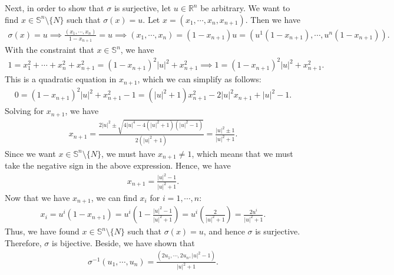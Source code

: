 Next, in order to show that $\sigma$ is surjective, let $u\in \mathbb{R}^n$ be arbitrary. We want to find $x\in \mathbb{S}^n\setminus \{N\}$ such that $\sigma(x)=u$. Let $x=(x_1,\cdots,x_n,x_{n+1})$. Then we have
\begin{align}
    \sigma(x)=u\implies \frac{(x_1,\cdots,x_n)}{1-x_{n+1}}=u\implies (x_1,\cdots,x_n)=(1-x_{n+1})u=(u^1(1-x_{n+1}),\cdots,u^n(1-x_{n+1})).
\end{align}
With the constraint that $x\in \mathbb{S}^n$, we have
\begin{align}
    1=x_1^2+\cdots+x_n^2+x_{n+1}^2=(1-x_{n+1})^2|u|^2+x_{n+1}^2\implies 1=(1-x_{n+1})^2|u|^2+x_{n+1}^2.
\end{align}
This is a quadratic equation in $x_{n+1}$, which we can simplify as follows:
\begin{align}
    0=(1-x_{n+1})^2|u|^2+x_{n+1}^2-1=(|u|^2+1)x_{n+1}^2-2|u|^2x_{n+1}+|u|^2-1.
\end{align}
Solving for $x_{n+1}$, we have
\begin{align}
    x_{n+1}=\frac{2|u|^2\pm \sqrt{4|u|^4-4(|u|^2+1)(|u|^2-1)}}{2(|u|^2+1)}=\frac{|u|^2\pm 1}{|u|^2+1}.
\end{align}
Since we want $x\in \mathbb{S}^n\setminus \{N\}$, we must have $x_{n+1}\neq 1$, which means that we must take the negative sign in the above expression. Hence, we have 
\begin{align}
    x_{n+1}=\frac{|u|^2-1}{|u|^2+1}.
\end{align}
Now that we have $x_{n+1}$, we can find $x_i$ for $i=1,\cdots,n$:
\begin{align}
    x_i=u^i(1-x_{n+1})=u^i\left(1-\frac{|u|^2-1}{|u|^2+1}\right)=u^i\left(\frac{2}{|u|^2+1}\right)=\frac{2u^i}{|u|^2+1}.
\end{align}
Thus, we have found $x\in \mathbb{S}^n\setminus \{N\}$ such that $\sigma(x)=u$, and hence $\sigma$ is surjective. Therefore, $\sigma$ is bijective. Beside, we have shown that
\begin{align}
    \sigma^{-1}(u_1,\cdots,u_n)=\frac{(2u_1,\cdots,2u_n, |u|^2-1)}{|u|^2+1}.
\end{align}

